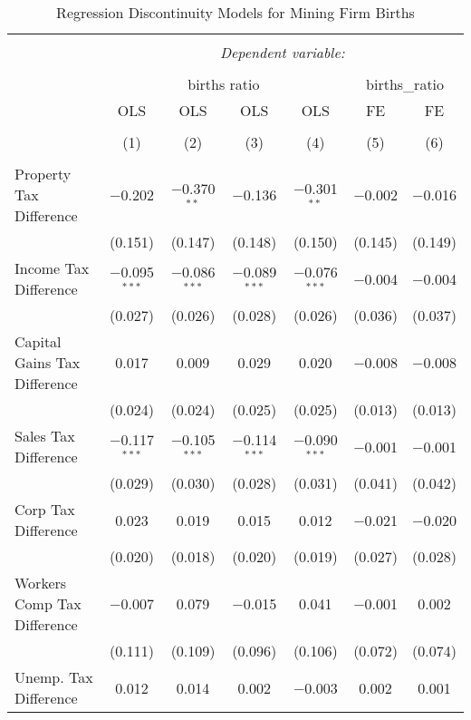 
\begin{table}[!htbp] \centering 
  \caption{Regression Discontinuity Models for  Mining Firm Births} 
  \label{21rd} 
\begin{tabular}{@{\extracolsep{5pt}}lcccccc} 
\\[-1.8ex]\hline 
\hline \\[-1.8ex] 
 & \multicolumn{6}{c}{\textit{Dependent variable:}} \\ 
\cline{2-7} 
\\[-1.8ex] & \multicolumn{4}{c}{births ratio} & \multicolumn{2}{c}{births\_ratio} \\ 
 & OLS & OLS & OLS & OLS & FE & FE \\ 
\\[-1.8ex] & (1) & (2) & (3) & (4) & (5) & (6)\\ 
\hline \\[-1.8ex] 
 Property Tax Difference & $-$0.202 & $-$0.370$^{**}$ & $-$0.136 & $-$0.301$^{**}$ & $-$0.002 & $-$0.016 \\ 
  & (0.151) & (0.147) & (0.148) & (0.150) & (0.145) & (0.149) \\ 
  Income Tax Difference & $-$0.095$^{***}$ & $-$0.086$^{***}$ & $-$0.089$^{***}$ & $-$0.076$^{***}$ & $-$0.004 & $-$0.004 \\ 
  & (0.027) & (0.026) & (0.028) & (0.026) & (0.036) & (0.037) \\ 
  Capital Gains Tax Difference & 0.017 & 0.009 & 0.029 & 0.020 & $-$0.008 & $-$0.008 \\ 
  & (0.024) & (0.024) & (0.025) & (0.025) & (0.013) & (0.013) \\ 
  Sales Tax Difference & $-$0.117$^{***}$ & $-$0.105$^{***}$ & $-$0.114$^{***}$ & $-$0.090$^{***}$ & $-$0.001 & $-$0.001 \\ 
  & (0.029) & (0.030) & (0.028) & (0.031) & (0.041) & (0.042) \\ 
  Corp Tax Difference & 0.023 & 0.019 & 0.015 & 0.012 & $-$0.021 & $-$0.020 \\ 
  & (0.020) & (0.018) & (0.020) & (0.019) & (0.027) & (0.028) \\ 
  Workers Comp Tax Difference & $-$0.007 & 0.079 & $-$0.015 & 0.041 & $-$0.001 & 0.002 \\ 
  & (0.111) & (0.109) & (0.096) & (0.106) & (0.072) & (0.074) \\ 
  Unemp. Tax Difference & 0.012 & 0.014 & 0.002 & $-$0.003 & 0.002 & 0.001 \\ 

\end{tabular}
\end{table}
